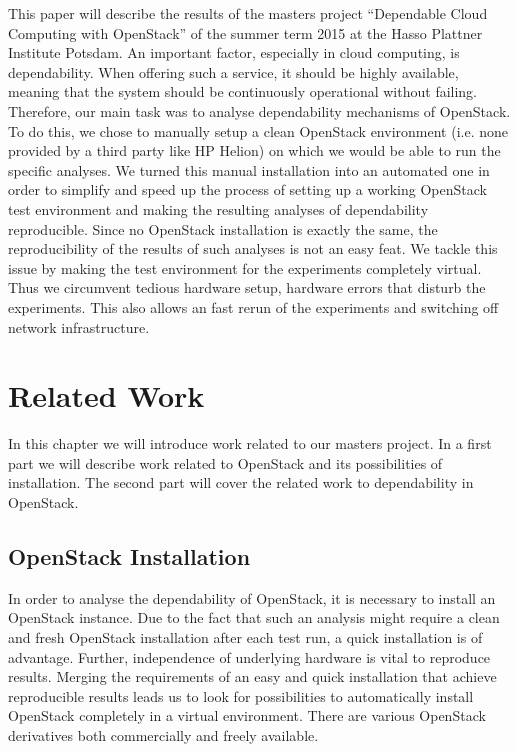 This paper will describe the results of the masters project ``Dependable Cloud Computing with OpenStack'' of the summer term 2015 at the Hasso Plattner Institute Potsdam. An important factor, especially in cloud computing, is dependability. When offering such a service, it should be highly available, meaning that the system should be continuously operational without failing. Therefore, our main task was to analyse dependability mechanisms of OpenStack. To do this, we chose to manually setup a clean OpenStack environment (i.e. none provided by a third party like HP Helion) on which we would be able to run the specific analyses. We turned this manual installation into an automated one in order to simplify and speed up the process of setting up a working OpenStack test environment and making the resulting analyses of dependability reproducible. Since no OpenStack installation is exactly the same, the reproducibility of the results of such analyses is not an easy feat. We tackle this issue by making the test environment for the experiments completely virtual. Thus we circumvent tedious hardware setup, hardware errors that disturb the experiments. This also allows an fast rerun of the experiments and switching off network infrastructure. 

\section{Related Work}
\label{related}
In this chapter we will introduce work related to our masters project. In a first part we will describe work related to OpenStack and its possibilities of installation. The second part will cover the related work to dependability in OpenStack.

\subsection{OpenStack Installation}
In order to analyse the dependability of OpenStack, it is necessary to install an OpenStack instance. Due to the fact that such an analysis might require a clean and fresh OpenStack installation after each test run, a quick installation is of advantage. Further, independence of underlying hardware is vital to reproduce results. Merging the requirements of an easy and quick installation that achieve reproducible results leads us to look for possibilities to automatically install OpenStack completely in a virtual environment. There are various OpenStack derivatives both commercially and freely available.

